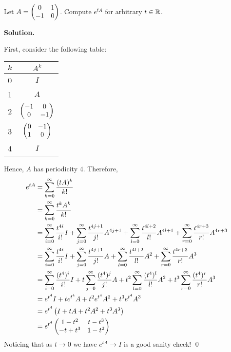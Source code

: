 \documentclass[12pt]{book}
\theoremstyle{definition}
\newenvironment{solution}
{%
  \par\noindent\textbf{Solution.}\quad
}
{%
  \qed\par
}
\begin{document}
\begin{taggedexercise}[WIP]
  Let $A = \begin{pmatrix} 0 & 1 \\ -1 & 0 \end{pmatrix}$. Compute $e^{tA}$ for arbitrary $t \in \mathbb{R}$.
\end{taggedexercise}

\begin{solution}
  First, consider the following table:

  \begin{table}[ht]
    \centering
    \begin{tabular}{c|c}

    $k$ & $A^k$  \\ 
    \hline
    0 & $I$ \\
    1 & $A$ \\
    2 & $\begin{pmatrix} -1 & 0 \\ 0 & -1 \end{pmatrix}$ \\
    3 & $\begin{pmatrix} 0 & -1 \\ 1 & 0 \end{pmatrix}$ \\
    4 & $I$ \\
    \end{tabular}
    \end{table}

  Hence, $A$ has periodicity $4$. 
  Therefore,
  \[
  \begin{aligned}
    e^{tA} &= \sum_{k=0}^\infty \frac{(tA)^k}{k!} \\
           &= \sum_{k=0}^\infty \frac{t^kA^k}{k!} \\
           &= \sum_{i=0}^\infty \frac{t^{4i}}{i!}I + \sum_{j=0}^\infty \frac{t^{4j + 1}}{j!}A^{4j+1} + \sum_{l=0}^\infty \frac{t^{4l + 2}}{l!}A^{4l+1} + \sum_{r=0}^\infty \frac{t^{4r + 3}}{r!}A^{4r+3} \\
           &= \sum_{i=0}^\infty \frac{t^{4i}}{i!}I + \sum_{j=0}^\infty \frac{t^{4j + 1}}{j!}A + \sum_{l=0}^\infty \frac{t^{4l + 2}}{l!}A^2 + \sum_{r=0}^\infty \frac{t^{4r + 3}}{r!}A^3 \\
           &= \sum_{i=0}^\infty \frac{(t^{4})^i}{i!}I + t\sum_{j=0}^\infty \frac{(t^{4})^j}{j!}A + t^2\sum_{l=0}^\infty \frac{(t^4)^l}{l!}A^2 + t^3\sum_{r=0}^\infty \frac{(t^4)^r}{r!}A^3 \\
           &= e^{t^4}I + te^{t^4}A + t^2e^{t^4}A^2 + t^3e^{t^4}A^3 \\
           &= e^{t^4}\left(I + tA + t^2A^2 + t^3A^3\right) \\
           &= e^{t^4} \begin{pmatrix} 1-t^2 & t - t^3 \\ -t + t^3 & 1 - t^2 \end{pmatrix}
  \end{aligned}
  \]  
  Noticing that as $t \to 0$ we have $e^{tA} \to I$ is a good sanity check!
\end{solution}
\end{document}
